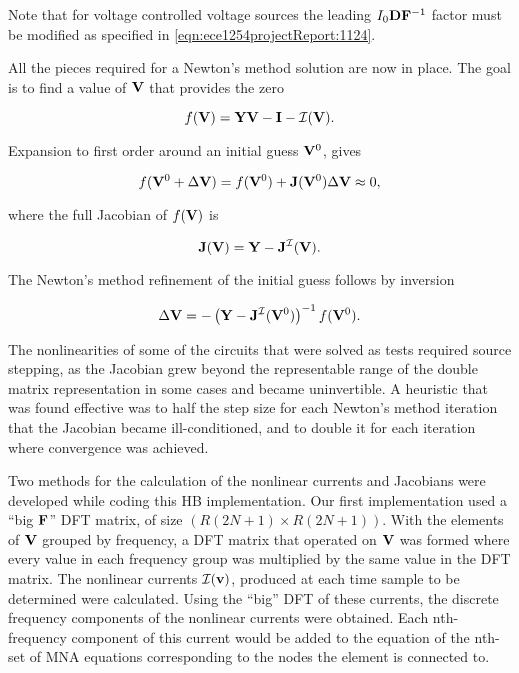 Note that for voltage controlled voltage sources the leading \( I_0 \mathbf{D} \mathbf{F}^{-1} \) factor must be modified as specified in \cref{eqn:ece1254projectReport:1124}.


All the pieces required for a Newton's method solution are now in place.
The goal is to find a value of \( \mathbf{V} \) that provides the zero

\begin{dmath}\label{eqn:ece1254projectReport:1220}
f(\BV) = \BY \BV - \BI - \calI(\BV).
\end{dmath}

Expansion to first order around an initial guess \( \mathbf{V}^0 \), gives

\begin{dmath}\label{eqn:ece1254projectReport:1240}
f( \BV^0 + \Delta \BV ) = f(\BV^0) + \BJ(\BV^0) \Delta \BV \approx 0,
\end{dmath}

where the full Jacobian of \( f(\mathbf{V}) \) is

\begin{dmath}\label{eqn:ece1254projectReport:1260}
\BJ(\BV) = \BY - \BJ^{\calI}(\BV).
\end{dmath}

The Newton's method refinement of the initial guess follows by inversion

\begin{dmath}\label{eqn:ece1254projectReport:1280}
\Delta \BV = -\lr{ \BY - \BJ^{\calI}(\BV^0) }^{-1} f(\BV^0).
\end{dmath}

The nonlinearities of some of the circuits that were solved as tests required source stepping, as the Jacobian grew beyond the representable range of the double matrix representation in some cases and became uninvertible.
A heuristic that was found effective was to half the step size for each Newton's method iteration that the Jacobian became ill-conditioned, and to double it for each iteration where convergence was achieved.


Two methods for the calculation of the nonlinear currents and Jacobians were developed while coding this HB implementation.
Our first implementation used
a ``big \( \mathbf{F} \)'' DFT matrix, of size \( ( R (2 N + 1 ) \times R (2 N + 1) ) \).
With the elements of \( \mathbf{V} \) grouped by frequency, a DFT matrix that operated on \( \mathbf{V} \) was formed where
every value in each frequency group was multiplied by the same value in the DFT matrix.
The nonlinear currents \( {\mathcal{I}}(\mathbf{v}) \), produced at each time sample to be determined were calculated.
Using the
``big'' DFT of these currents, the discrete frequency
components of the nonlinear currents were obtained.
Each nth-frequency component of this current would be added
to the equation of the nth-set of MNA equations corresponding to the nodes the element is connected
to.

